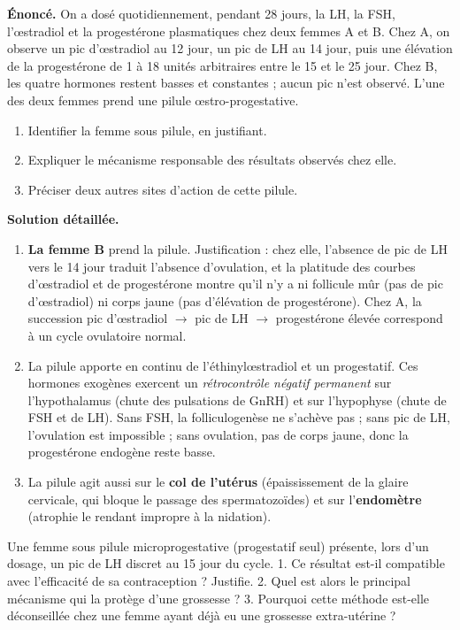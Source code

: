 \documentclass[11pt]{article}
\begin{document}
\begin{exoresolu}
\textbf{Énoncé.} On a dosé quotidiennement, pendant 28 jours, la LH, la FSH, l'\oe{}stradiol et la progestérone plasmatiques chez deux femmes A et B. Chez A, on observe un pic d'\oe{}stradiol au 12\ieme{} jour, un pic de LH au 14\ieme{} jour, puis une élévation de la progestérone de 1 à 18 unités arbitraires entre le 15\ieme{} et le 25\ieme{} jour. Chez B, les quatre hormones restent basses et constantes ; aucun pic n'est observé. L'une des deux femmes prend une pilule œstro-progestative.
\begin{enumerate}
\item Identifier la femme sous pilule, en justifiant.
\item Expliquer le mécanisme responsable des résultats observés chez elle.
\item Préciser deux autres sites d'action de cette pilule.
\end{enumerate}
\tcblower
\textbf{Solution détaillée.}
\begin{enumerate}
\item \textbf{La femme B} prend la pilule. Justification : chez elle, l'absence de pic de LH vers le 14\ieme{} jour traduit l'absence d'ovulation, et la platitude des courbes d'\oe{}stradiol et de progestérone montre qu'il n'y a ni follicule mûr (pas de pic d'\oe{}stradiol) ni corps jaune (pas d'élévation de progestérone). Chez A, la succession pic d'\oe{}stradiol $\rightarrow$ pic de LH $\rightarrow$ progestérone élevée correspond à un cycle ovulatoire normal.
\item La pilule apporte en continu de l'éthinylœstradiol et un progestatif. Ces hormones exogènes exercent un \emph{rétrocontrôle négatif permanent} sur l'hypothalamus (chute des pulsations de GnRH) et sur l'hypophyse (chute de FSH et de LH). Sans FSH, la folliculogenèse ne s'achève pas ; sans pic de LH, l'ovulation est impossible ; sans ovulation, pas de corps jaune, donc la progestérone endogène reste basse.
\item La pilule agit aussi sur le \textbf{col de l'utérus} (épaississement de la glaire cervicale, qui bloque le passage des spermatozoïdes) et sur l'\textbf{endomètre} (atrophie le rendant impropre à la nidation).
\end{enumerate}
\end{exoresolu}

\begin{exercice}
Une femme sous pilule microprogestative (progestatif seul) présente, lors d'un dosage, un pic de LH discret au 15\ieme{} jour du cycle. 1. Ce résultat est-il compatible avec l'efficacité de sa contraception ? Justifie. 2. Quel est alors le principal mécanisme qui la protège d'une grossesse ? 3. Pourquoi cette méthode est-elle déconseillée chez une femme ayant déjà eu une grossesse extra-utérine ?
\end{exercice}
\end{document}
